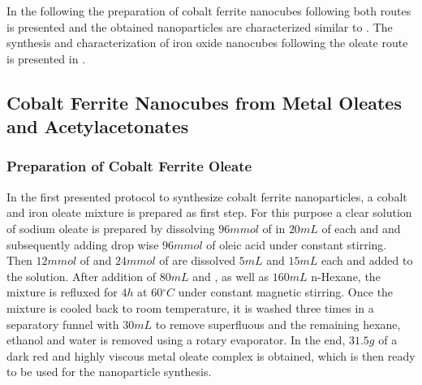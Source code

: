 \documentclass[\main/dresen_thesis.tex]{subfiles}
\begin{document}
  In the following the preparation of cobalt ferrite nanocubes following both routes is presented and the obtained nanoparticles are characterized similar to .
  The synthesis and characterization of iron oxide nanocubes following the oleate route is presented in .

  \subsection{Cobalt Ferrite Nanocubes from Metal Oleates and Acetylacetonates}
    \subsubsection{Preparation of Cobalt Ferrite Oleate}
      In the first presented protocol to synthesize cobalt ferrite nanoparticles, a cobalt and iron oleate mixture is prepared as first step.
      For this purpose a clear solution of sodium oleate is prepared by dissolving $96 \unit{mmol}$ of  in $20 \unit{mL}$ of each  and  and subsequently adding drop wise $96 \unit{mmol}$ of oleic acid under constant stirring.
      Then $12 \unit{mmol}$ of  and $24 \unit{mmol}$ of  are dissolved $5 \unit{mL}$  and $15 \unit{mL}$  each and added to the solution.
      After addition of $80 \unit{mL}$  and , as well as $160 \unit{mL}$ n-Hexane, the mixture is refluxed for $4 \unit{h}$ at $60 \unit{^\circ C}$ under constant magnetic stirring.
      Once the mixture is cooled back to room temperature, it is washed three times in a separatory funnel with $30 \unit{mL}$  to remove superfluous  and the remaining hexane, ethanol and water is removed using a rotary evaporator.
      In the end, $31.5 \unit{g}$ of a dark red and highly viscous metal oleate complex is obtained, which is then ready to be used for the nanoparticle synthesis.
\end{document}
